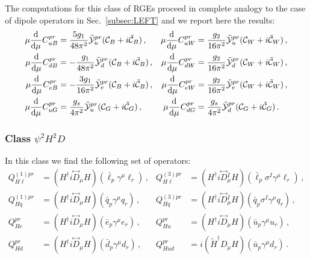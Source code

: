 The computations for this class of RGEs proceed in complete analogy to the case of dipole operators in Sec.~\ref{subsec:LEFT} and we report here the results:
\begin{align}
    \mu \dv[]{}{\mu}  C_{uB}^{pr} &=\frac{5 g_1}{48\pi^2}  \tilde{\mathcal{Y}}_u^{pr} ({\mathcal{C}}_{B} + i  \tilde{\mathcal{C}}_{B})\,,
    &
    \mu \dv[]{}{\mu}  C_{uW}^{pr} &=\frac{g_2}{16\pi^2}  
 \tilde{\mathcal{Y}}_u^{pr} ({\mathcal{C}}_{W} + i  \tilde{\mathcal{C}}_{W})\,,  \\
 \mu \dv[]{}{\mu}  C_{dB}^{pr} &= -\frac{g_1}{48\pi^2}  \tilde{\mathcal{Y}}_d^{pr} ({\mathcal{C}}_{B} + i  \tilde{\mathcal{C}}_{B})\,,
    &
    \mu \dv[]{}{\mu}  C_{dW}^{pr} &= \frac{g_2}{16\pi^2} 
 \tilde{\mathcal{Y}}_d^{pr} ({\mathcal{C}}_{W} + i  \tilde{\mathcal{C}}_{W})\,,  \\
 \mu \dv[]{}{\mu}  C_{eB}^{pr} &= -\frac{3g_1}{16\pi^2}  \tilde{\mathcal{Y}}_e^{pr} ({\mathcal{C}}_{B} + i  \tilde{\mathcal{C}}_{B})\,,
    &
    \mu \dv[]{}{\mu}  C_{eW}^{pr} &= \frac{g_2}{16\pi^2} 
 \tilde{\mathcal{Y}}_e^{pr} ({\mathcal{C}}_{W} + i  \tilde{\mathcal{C}}_{W})\,,  \\
 \mu \dv[]{}{\mu}  C_{uG}^{pr} &= \frac{g_s }{4\pi^2} 
 \tilde{\mathcal{Y}}_u^{pr} ({\mathcal{C}}_{G} +i  \tilde{\mathcal{C}}_{G})\,, &
 \mu \dv[]{}{\mu}  C_{dG}^{pr} &= \frac{g_s}{4\pi^2}  
 \tilde{\mathcal{Y}}_d^{pr} ({\mathcal{C}}_{G} +i  \tilde{\mathcal{C}}_{G})\,.
\end{align}
%

\subsubsection{Class $\psi^2 H^2 D$}

In this class we find the following set of operators:
\begin{align}
Q_{H\ell}^{(1)pr} &= (H^\dagger i \overset{\leftrightarrow}{D}_\mu H)(\bar{\ell}_p \gamma^\mu \ell_r)\,,  &Q_{H \ell}^{(3)pr} &= (H^\dagger i \overset{\leftrightarrow}{D}{}^I_\mu H)(\bar{\ell}_p \sigma^I \gamma^\mu \ell_r) \,, \\
Q_{Hq}^{(1)pr} &= (H^\dagger i \overset{\leftrightarrow}{D}_\mu H)(\bar{q}_p \gamma^\mu q_r)\,,  &Q_{Hq}^{(3)pr} &= (H^\dagger i \overset{\leftrightarrow}{D}{}^I_\mu H)(\bar{q}_p \sigma^I \gamma^\mu q_r)\,, \\
Q_{He}^{pr} &= (H^\dagger i \overset{\leftrightarrow}{D}_\mu H)(\bar{e}_p \gamma^\mu e_r)\,,  &Q_{Hu}^{pr} &= (H^\dagger i \overset{\leftrightarrow}{D}_\mu H)(\bar{u}_p  \gamma^\mu u_r)\,, \\
Q_{Hd}^{pr} &= (H^\dagger i \overset{\leftrightarrow}{D}_\mu H)(\bar{d}_p \gamma^\mu d_r)\,,  &Q_{Hud}^{pr} &= i(\tilde{H}^\dagger D_\mu H)(\bar{u}_p  \gamma^\mu d_r) \,.
\end{align}

